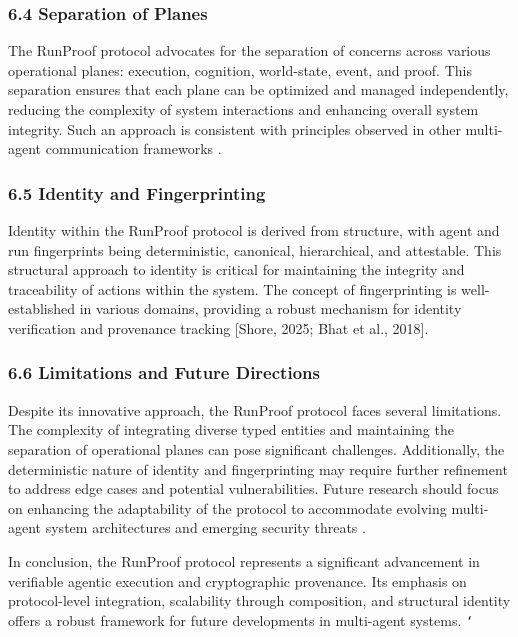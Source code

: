 \documentclass[11pt]{article}
\begin{document}
\subsubsection{6.4 Separation of Planes}

The RunProof protocol advocates for the separation of concerns across various operational planes: execution, cognition, world-state, event, and proof. This separation ensures that each plane can be optimized and managed independently, reducing the complexity of system interactions and enhancing overall system integrity. Such an approach is consistent with principles observed in other multi-agent communication frameworks \cite{Zhu2022}.

\subsubsection{6.5 Identity and Fingerprinting}

Identity within the RunProof protocol is derived from structure, with agent and run fingerprints being deterministic, canonical, hierarchical, and attestable. This structural approach to identity is critical for maintaining the integrity and traceability of actions within the system. The concept of fingerprinting is well-established in various domains, providing a robust mechanism for identity verification and provenance tracking [Shore, 2025; Bhat et al., 2018].

\subsubsection{6.6 Limitations and Future Directions}

Despite its innovative approach, the RunProof protocol faces several limitations. The complexity of integrating diverse typed entities and maintaining the separation of operational planes can pose significant challenges. Additionally, the deterministic nature of identity and fingerprinting may require further refinement to address edge cases and potential vulnerabilities. Future research should focus on enhancing the adaptability of the protocol to accommodate evolving multi-agent system architectures and emerging security threats \cite{Sharma2025}.

In conclusion, the RunProof protocol represents a significant advancement in verifiable agentic execution and cryptographic provenance. Its emphasis on protocol-level integration, scalability through composition, and structural identity offers a robust framework for future developments in multi-agent systems.
\texttt{`}
\end{document}
